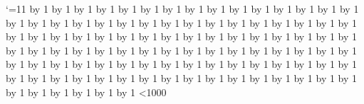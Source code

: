 \catcode`\@=11
\newcount\n \newcount\m
\def\a{}\def\b#1{}\def\c#1,#2.{}
\expandafter\def\csname w\endcsname{}
\def\h{\advance\m by 1 \advance\m by 1 \advance\m by 1 \advance\m by 1 \advance\m by 1 \advance\m by 1 \advance\m by 1 \advance\m by 1 \advance\m by 1 \advance\m by 1 \advance\m by 1 \advance\m by 1 \advance\m by 1 \advance\m by 1 \advance\m by 1 \advance\m by 1 \advance\m by 1 \advance\m by 1 \advance\m by 1 \advance\m by 1 \advance\m by 1 \advance\m by 1 \advance\m by 1 \advance\m by 1 \advance\m by 1 \advance\m by 1 \advance\m by 1 \advance\m by 1 \advance\m by 1 \advance\m by 1 \advance\m by 1 \advance\m by 1 \advance\m by 1 \advance\m by 1 \advance\m by 1 \advance\m by 1 \advance\m by 1 \advance\m by 1 \advance\m by 1 \advance\m by 1 \advance\m by 1 \advance\m by 1 \advance\m by 1 \advance\m by 1 \advance\m by 1 \advance\m by 1 \advance\m by 1 \advance\m by 1 \advance\m by 1 \advance\m by 1 \advance\m by 1 \advance\m by 1 \advance\m by 1 \advance\m by 1 \advance\m by 1 \advance\m by 1 \advance\m by 1 \advance\m by 1 \advance\m by 1 \advance\m by 1 \advance\m by 1 \advance\m by 1 \advance\m by 1 \advance\m by 1 \advance\m by 1 \advance\m by 1 \advance\m by 1 \advance\m by 1 \advance\m by 1 \advance\m by 1 \advance\m by 1 \advance\m by 1 \advance\m by 1 \advance\m by 1 \advance\m by 1 \advance\m by 1 \advance\m by 1 \advance\m by 1 \advance\m by 1 \advance\m by 1 \advance\m by 1 \advance\m by 1 \advance\m by 1 \advance\m by 1 \advance\m by 1 \advance\m by 1 \advance\m by 1 \advance\m by 1 \advance\m by 1 \advance\m by 1 \advance\m by 1 \advance\m by 1 \advance\m by 1 \advance\m by 1 \advance\m by 1 \advance\m by 1 \advance\m by 1 \advance\m by 1 \advance\m by 1 \advance\m by 1 }
 \loop \h \advance\n by 1 \ifnum\n<1000 \repeat
\bye
